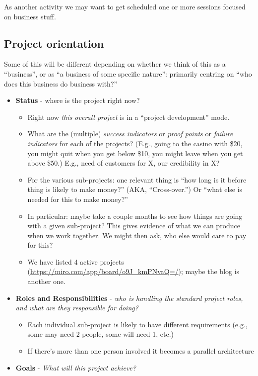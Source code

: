 \documentclass[11pt]{article}
\begin{document}
As another activity we may want to get scheduled one or more sessions
focused on business stuff.

\subsection{Project orientation}
\label{sec:org3a4d230}

Some of this will be different depending on whether we think of this
as a “business”, or as “a business of some specific nature”: primarily
centring on “who does this business do business with?”

\begin{itemize}
\item \textbf{Status} - where is the project right now?
\begin{itemize}
\item Right now \emph{this overall project} is in a “project development” mode.
\item What are the (multiple) \emph{success indicators} or \emph{proof points} or \emph{failure indicators} for each of the projects? (E.g., going to the casino with \$20, you might quit when you get below \$10, you might leave when you get above \$50.) E.g., need of customers for X, our credibility in X?
\item For the various sub-projects: one relevant thing is “how long is it before thing is likely to make money?” (AKA, “Cross-over.”) Or “what else is needed for this to make money?”
\item In particular: maybe take a couple months to see how things are going with a given sub-project? This gives evidence of what we can produce when we work together. We might then ask, who else would care to pay for this?
\item We have listed 4 active projects (\url{https://miro.com/app/board/o9J\_kmPNvaQ=/}); maybe the blog is another one.
\end{itemize}
\item \textbf{Roles and Responsibilities} - \emph{who is handling the standard project roles, and what are they responsible for doing?}
\begin{itemize}
\item Each individual sub-project is likely to have different requirements (e.g., some may need 2 people, some will need 1, etc.)
\item If there’s more than one person involved it becomes a parallel architecture
\end{itemize}
\item \textbf{Goals} - \emph{What will this project achieve?}

\end{itemize}
\end{document}
